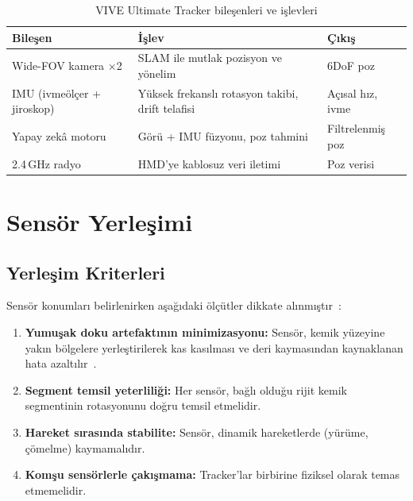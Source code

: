 \documentclass[11pt,a4paper]{article}
\begin{document}
\begin{table}[H]
\centering
\caption{VIVE Ultimate Tracker bile\c{s}enleri ve i\c{s}levleri}
\label{tab:tracker_bilesenler}
\renewcommand{\arraystretch}{1.2}
\begin{tabularx}{\textwidth}{lXl}
\toprule
\textbf{Bile\c{s}en} & \textbf{\.I\c{s}lev} & \textbf{\c{C}{\i}k{\i}\c{s}} \\
\midrule
Wide-FOV kamera $\times$2 & SLAM ile mutlak pozisyon ve y\"onelim & 6DoF poz \\
IMU (ivme\"ol\c{c}er + jiroskop) & Y\"uksek frekansl{\i} rotasyon takibi, drift telafisi & A\c{c}{\i}sal h{\i}z, ivme \\
Yapay zek\^a motoru & G\"or\"u + IMU f\"uzyonu, poz tahmini & Filtrelenmi\c{s} poz \\
2.4\,GHz radyo & HMD'ye kablosuz veri iletimi & Poz verisi \\
\bottomrule
\end{tabularx}
\end{table}

\section{Sens\"or Yerle\c{s}imi}
\label{sec:yerlesim}

\subsection{Yerle\c{s}im Kriterleri}

Sens\"or konumlar{\i} belirlenirken a\c{s}a\u{g}{\i}daki \"ol\c{c}\"utler dikkate
al{\i}nm{\i}\c{s}t{\i}r~\cite{cuesta2010,niswander2020}:

\begin{enumerate}[nosep]
    \item \textbf{Yumu\c{s}ak doku artefakt{\i}n{\i}n minimizasyonu:} Sens\"or, kemik
          y\"uzeyine yak{\i}n b\"olgelere yerle\c{s}tirilerek kas kas{\i}lmas{\i} ve
          deri kaymas{\i}ndan kaynaklanan hata azalt{\i}l{\i}r~\cite{leardini2005}.
    \item \textbf{Segment temsil yeterlili\u{g}i:} Her sens\"or, ba\u{g}l{\i} oldu\u{g}u
          rijit kemik segmentinin rotasyonunu do\u{g}ru temsil etmelidir.
    \item \textbf{Hareket s{\i}ras{\i}nda stabilite:} Sens\"or, dinamik hareketlerde
          (y\"ur\"ume, \c{c}\"omelme) kaymamal{\i}d{\i}r.
    \item \textbf{Kom\c{s}u sens\"orlerle \c{c}ak{\i}\c{s}mama:} Tracker'lar birbirine
          fiziksel olarak temas etmemelidir.
\end{enumerate}
\end{document}
